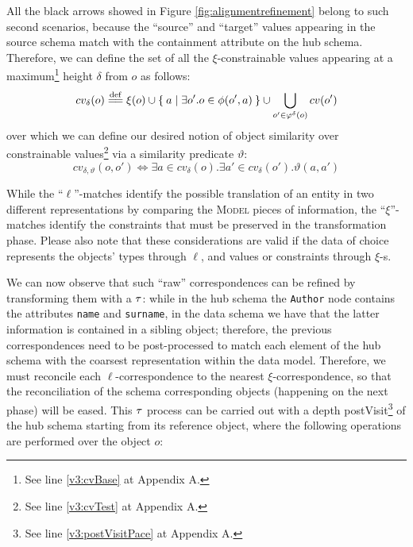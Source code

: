 \begin{example}[continues=ex:examplegraphdata,label=ex:examplereferencedOcaml]
All the black arrows showed in Figure \vref{fig:alignmentrefinement} belong to such second scenarios, because the ``source'' and ``target'' values appearing in the source schema match with the containment attribute on the hub schema. Therefore, we can define the set of all the $\xi$-constrainable values appearing at a maximum\footnote{See line \ref{v3:cvBase} at Appendix A.} height $\delta$ from $o$ as follows:
\[cv_\delta(o)\overset{\mathrm{def}}{=\mathrel{\mkern-3mu}=}\xi(o)\cup\Set{a|\exists o'. o\in\phi(o',a)}\cup\bigcup_{o'\in\varphi^\delta(o)}cv(o') \]
over which we can define our desired notion of object similarity over constrainable values\footnote{See line \ref{v3:cvTest} at Appendix A.} via a similarity predicate $\vartheta$:
\[cv_{\delta,\vartheta}(o,o')\Leftrightarrow \exists a\in cv_\delta(o).\exists a'\in cv_\delta(o').\vartheta(a,a')\]

While the ``$\ell$''-matches identify the possible translation of an entity in two different representations by comparing the \textsc{Model} pieces of information, the ``$\xi$''-matches identify the constraints that must be preserved in the transformation phase. Please also note that these considerations are valid if the data of choice represents the objects' types through $\ell$, and values or constraints through $\xi$-s.
\bigskip


We can now observe that such ``raw'' correspondences  can be refined by  transforming them with a $\ttransl$: while in the hub schema the \texttt{Author} node contains the attributes \texttt{name} and \texttt{surname}, in the data schema we have that the latter information is contained in a sibling object; therefore, the previous correspondences need to be post-processed to match each element of the hub schema with the coarsest representation within the data model. Therefore, we must reconcile each $\ell$-correspondence to the nearest $\xi$-correspondence, so that the reconciliation of the schema corresponding objects (happening on the next phase) will be eased. This $\ttransl$ process can be carried out with a depth postVisit\footnote{See line \ref{v3:postVisitPace} at Appendix A.} of the hub schema starting from its reference object, where the following operations are performed over the object $o$:


\end{example}
